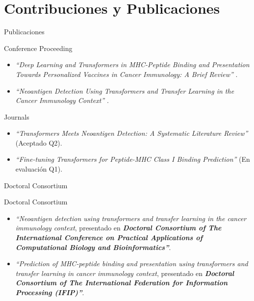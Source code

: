 \documentclass[10pt]{beamer}
\newcommand{\1}{
	\setbeamertemplate{background}{
		\texttt{[image: img/1]}
		\tikz[overlay] \fill[fill opacity=0.75,fill=white] (0,0) rectangle (-\paperwidth,\paperheight);
	}
}
\begin{document}
\section{Contribuciones y Publicaciones}

\begin{frame}{Publicaciones}{}	
	\begin{block}{Conference Proceeding}
		\begin{itemize}
			\item \textit{``Deep Learning and Transformers in MHC-Peptide Binding and Presentation Towards Personalized Vaccines in Cancer Immunology: A Brief Review''} \cite{machaca2023deep}.
			\item \textit{``Neoantigen Detection Using Transformers and Transfer Learning in the Cancer Immunology Context''} \cite{arceda2023neoantigen}.
		\end{itemize}
	\end{block}	

	\begin{block}{Journals}
		\begin{itemize}
			\item \textit{``Transformers Meets Neoantigen Detection: A Systematic Literature Review''} (Aceptado Q2).
			\item \textit{``Fine-tuning Transformers for Peptide-MHC Class I Binding Prediction''} (En evaluación Q1).
		\end{itemize}
	\end{block}	
\end{frame}

\begin{frame}{Doctoral Consortium}{}	
	\begin{block}{Doctoral Consortium}
		\begin{itemize}
			\item \textit{``Neoantigen detection using transformers and transfer learning in the cancer immunology context}, presentado en \textbf{\textit{Doctoral Consortium of The International Conference on Practical Applications of Computational Biology and Bioinformatics''}}.
			\item \textit{``Prediction of MHC-peptide binding and presentation using transformers and transfer learning 
in cancer immunology context}, presentado en \textbf{\textit{Doctoral Consortium of The International Federation for Information Processing (IFIP)''}}.
		\end{itemize}
	\end{block}	

\end{frame}
\end{document}
